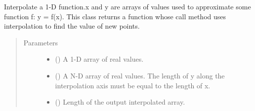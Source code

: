 \documentclass[letterpaper,10pt,english,openany, oneside]{sphinxmanual}
\begin{document}
\begin{fulllineitems}
\begin{quote}
\begin{description}
\begin{itemize}
\end{itemize}

\end{description}\end{quote}

\begin{fulllineitems}
\label{\detokenize{index:fompy.conditioning.interpolator.lin_interpol}}
Interpolate a 1-D function.x and y are arrays of values used to approximate
some function f: y = f(x). This class returns a function
whose call method uses interpolation to find the value of new points.

\end{fulllineitems}

\begin{quote}\begin{description}
\item[{Parameters}] \leavevmode\begin{itemize}
\item {} 
 (\sphinxstyleliteralemphasis{\sphinxupquote{, }}\sphinxstyleliteralemphasis{\sphinxupquote{ (}}\sphinxstyleliteralemphasis{\sphinxupquote{,}}\sphinxstyleliteralemphasis{\sphinxupquote{)}}) \textendash{} A 1-D array of real values.

\item {} 
 () \textendash{} A N-D array of real values. The length of y along
the interpolation axis must be equal to the length of x.

\item {} 
 () \textendash{} Length of the output interpolated array.

\end{itemize}

\end{description}\end{quote}

\end{fulllineitems}

\end{document}
